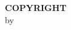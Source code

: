 \thispagestyle{empty}
\doublespacing

\begin{center}

    \begingroup
    \textbf{COPYRIGHT} \\
    \endgroup
    by \\
    \myName \\

    \myYear
    \vfill
\end{center}
